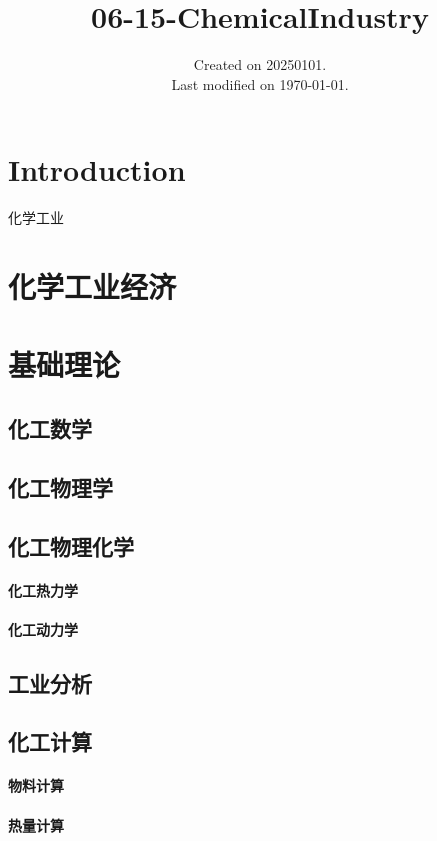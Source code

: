 \documentclass[UTF8]{../../ApplicationUniverse}
\begin{document}
\title{06-15-ChemicalIndustry}
\date{Created on 20250101.\\   Last modified on \today.}
\maketitle
\tableofcontents


\chapter{Introduction}


化学工业



\chapter{化学工业经济}



\chapter{基础理论}
\section{化工数学}
\section{化工物理学}
\section{化工物理化学}
    \subsubsection{化工热力学}
    \subsubsection{化工动力学}
\section{工业分析}
\section{化工计算}
    \subsubsection{物料计算}
    \subsubsection{热量计算}
\end{document}
